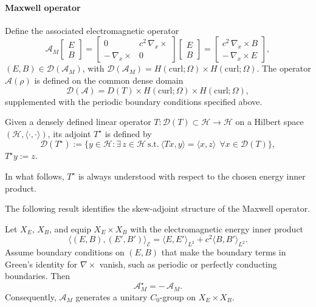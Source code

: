 \documentclass[AMA,Times2COL]{WileyNJDv5}
\begin{document}
\paragraph*{Maxwell operator}
Define the associated electromagnetic operator
\begin{equation}\label{eq:A_M}
\mathcal{A}_M
\begin{bmatrix} E \\[0.2em] B \end{bmatrix}
=
\begin{bmatrix}
0 & c^{2}\,\nabla_x \!\times \\[0.3em]
-\,\nabla_x \!\times & 0
\end{bmatrix}
\begin{bmatrix} E \\[0.2em] B \end{bmatrix}
=
\begin{bmatrix}
c^{2}\,\nabla_x \!\times B \\[0.3em]
-\,\nabla_x \!\times E
\end{bmatrix},
\end{equation}
$(E,B)\in \mathcal{D}(\mathcal{A}_M)$, with \(
\mathcal D(\mathcal A_M)
=
H(\mathrm{curl};\Omega)
\times
H(\mathrm{curl};\Omega).
\) 
The operator $\mathcal A(\rho)$ is defined on the common dense domain
\[
\mathcal D(\mathcal A)=
D(T)\times H(\mathrm{curl};\Omega)\times H(\mathrm{curl};\Omega),
\]
supplemented with the periodic boundary conditions specified above.

\begin{definition}
Given a densely defined linear operator
$T:\mathcal{D}(T)\subset \mathscr{H}\to \mathscr{H}$ on a Hilbert space
$(\mathscr{H},\langle\cdot,\cdot\rangle)$, its adjoint $T^{\star}$ is defined by
\[
\mathcal{D}(T^{\star})
:=
\Big\{y\in \mathscr{H}:\exists\,z\in\mathscr{H}\ \text{s.t.}\ 
\langle Tx,y\rangle=\langle x,z\rangle\ \ \forall x\in\mathcal{D}(T)\Big\},
\]
$T^{\star}y:=z.$
\end{definition}
In what follows, $T^{\star}$ is always understood with respect to the chosen energy inner product.

The following result identifies the skew-adjoint structure of the Maxwell operator.

\begin{proposition}
\label{prop:AM-skew}
Let $X_E$, $X_B$, and equip $X_E\times X_B$ with the electromagnetic energy inner product
\[
\langle (E,B),(E',B')\rangle_{\mathcal E}
=
\langle E,E'\rangle_{L^2}
+
c^2\langle B,B'\rangle_{L^2}.
\]
Assume boundary conditions on $(E,B)$ that make the boundary terms in Green's identity for $\nabla\times$ vanish, such as periodic or perfectly conducting boundaries. Then
\[
\mathcal{A}_M^{\star}=-\,\mathcal{A}_M .
\]
Consequently, $\mathcal{A}_M$ generates a unitary $C_0$-group on $X_E\times X_B$.
\end{proposition}
\end{document}
